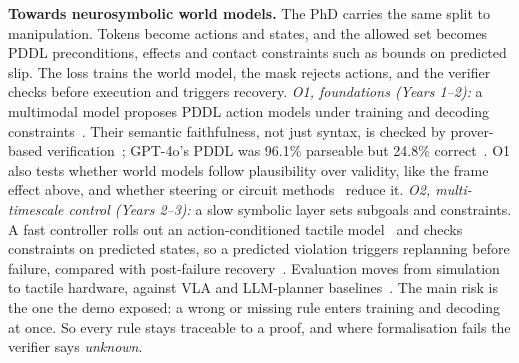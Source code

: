 \documentclass[letterpaper, 10pt, conference]{IEEEtran}
\begin{document}
\textbf{Towards neurosymbolic world models.} The PhD carries the same split to manipulation. Tokens become actions and states, and the allowed set becomes PDDL preconditions, effects and contact constraints such as bounds on predicted slip. The loss trains the world model, the mask rejects actions, and the verifier checks before execution and triggers recovery. \emph{O1, foundations (Years 1--2):} a multimodal model proposes PDDL action models under training and decoding constraints~\cite{xu2018,ahmed2023}. Their semantic faithfulness, not just syntax, is checked by prover-based verification~\cite{quan2024,quan2025}; GPT-4o's PDDL was 96.1\% parseable but 24.8\% correct~\cite{planetarium}. O1 also tests whether world models follow plausibility over validity, like the frame effect above, and whether steering or circuit methods~\cite{valentino2026,kim2025} reduce it. \emph{O2, multi-timescale control (Years 2--3):} a slow symbolic layer sets subgoals and constraints. A fast controller rolls out an action-conditioned tactile model~\cite{mandil,nazari2022} and checks constraints on predicted states, so a predicted violation triggers replanning before failure, compared with post-failure recovery~\cite{reflect}. Evaluation moves from simulation to tactile hardware, against VLA and LLM-planner baselines~\cite{liberopro,duggan}. The main risk is the one the demo exposed: a wrong or missing rule enters training and decoding at once. So every rule stays traceable to a proof, and where formalisation fails the verifier says \emph{unknown}.
\end{document}
